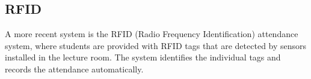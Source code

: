  \subsection{RFID}
 A more recent system is the RFID (Radio Frequency Identification) attendance system, where students are provided with RFID tags that are detected by sensors installed in the lecture room. The system identifies the individual tags and records the attendance automatically.





